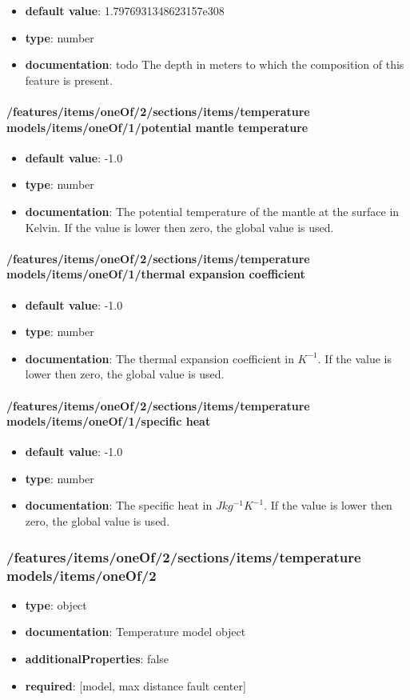 \begin{itemize}\item {\bf default value}: 1.7976931348623157e308
\item {\bf type}: number
\item {\bf documentation}: todo The depth in meters to which the composition of this feature is present.
\end{itemize}\paragraph{/features/items/oneOf/2/sections/items/temperature models/items/oneOf/1/potential mantle temperature}
\begin{itemize}\item {\bf default value}: -1.0
\item {\bf type}: number
\item {\bf documentation}: The potential temperature of the mantle at the surface in Kelvin. If the value is lower then zero, the global value is used.
\end{itemize}\paragraph{/features/items/oneOf/2/sections/items/temperature models/items/oneOf/1/thermal expansion coefficient}
\begin{itemize}\item {\bf default value}: -1.0
\item {\bf type}: number
\item {\bf documentation}: The thermal expansion coefficient in $K^{-1}$. If the value is lower then zero, the global value is used.
\end{itemize}\paragraph{/features/items/oneOf/2/sections/items/temperature models/items/oneOf/1/specific heat}
\begin{itemize}\item {\bf default value}: -1.0
\item {\bf type}: number
\item {\bf documentation}: The specific heat in $J kg^{-1} K^{-1}$. If the value is lower then zero, the global value is used.
\end{itemize}\subsubsection{/features/items/oneOf/2/sections/items/temperature models/items/oneOf/2}
\begin{itemize}\item {\bf type}: object
\item {\bf documentation}: Temperature model object
\item {\bf additionalProperties}: false
\item {\bf required}: [model, max distance fault center]\end{itemize}
